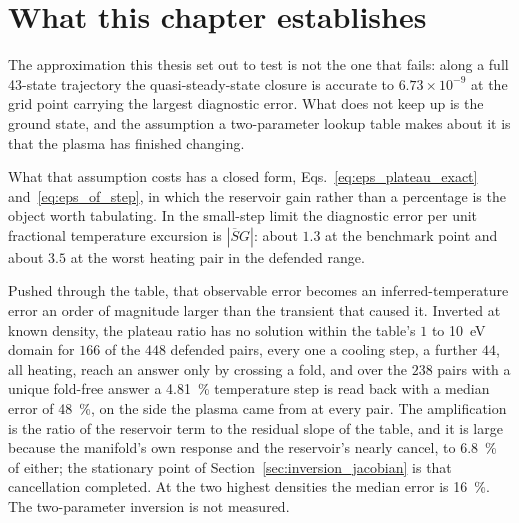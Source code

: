 \section{What this chapter establishes}
\label{sec:results_summary}

The approximation this thesis set out to test is not the one that fails: along
a full 43-state trajectory the quasi-steady-state closure is accurate to
$6.73\times10^{-9}$ at the grid point carrying the largest diagnostic error.
What does not keep up is the ground state, and the assumption a two-parameter
lookup table makes about it is that the plasma has finished changing.

What that assumption costs has a closed form, Eqs.~\eqref{eq:eps_plateau_exact}
and~\eqref{eq:eps_of_step}, in which the reservoir gain rather than a
percentage is the object worth tabulating. In the small-step limit the
diagnostic error per unit fractional temperature excursion is
$|\overline{S}G|$: about $1.3$ at the benchmark point and about $3.5$ at the
worst heating pair in the defended range.

Pushed through the table, that observable error becomes an inferred-temperature
error an order of magnitude larger than the transient that caused it. Inverted
at known density, the plateau ratio has no solution within the table's $1$ to
\SI{10}{\electronvolt} domain for $166$ of the $448$ defended pairs, every one
a cooling step, a further $44$, all heating, reach an answer only by crossing
a fold, and over the $238$ pairs with a unique fold-free answer a
\SI{4.81}{\percent} temperature step is read back with a median error of
\SI{48}{\percent}, on the side the plasma came from at every pair. The
amplification is the ratio of the reservoir term to the residual slope of the
table, and it is large because the manifold's own response and the reservoir's
nearly cancel, to \SI{6.8}{\percent} of either; the stationary point of
Section~\ref{sec:inversion_jacobian} is that cancellation completed. At the
two highest densities the median error is \SI{16}{\percent}. The
two-parameter inversion is not measured.

